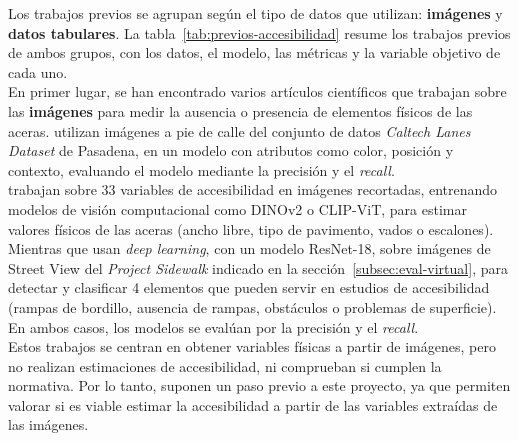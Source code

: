 Los trabajos previos se agrupan según el tipo de datos que utilizan: \textbf{imágenes} y \textbf{datos tabulares}. La tabla~\ref{tab:previos-accesibilidad} resume los trabajos previos de ambos grupos, con los datos, el modelo, las métricas y la variable objetivo de cada uno.
\\

En primer lugar, se han encontrado varios artículos científicos que trabajan sobre las \textbf{imágenes} para medir la ausencia o presencia de elementos físicos de las aceras. \textcite{smith2013} utilizan imágenes a pie de calle del conjunto de datos \textit{Caltech Lanes Dataset} de Pasadena, en un modelo  con atributos como color, posición y contexto, evaluando el modelo mediante la precisión y el \textit{recall}.
\\

\textcite{liu2024acc} trabajan sobre 33 variables de accesibilidad en imágenes recortadas, entrenando modelos de visión computacional como DINOv2 o CLIP-ViT, para estimar valores físicos de las aceras (ancho libre, tipo de pavimento, vados o escalones).
\\

Mientras que \textcite{weld2019} usan \textit{deep learning}, con un modelo ResNet-18, sobre imágenes de Street View del \textit{Project Sidewalk} indicado en la sección~\ref{subsec:eval-virtual}, para detectar y clasificar 4 elementos que pueden servir en estudios de accesibilidad (rampas de bordillo, ausencia de rampas, obstáculos o problemas de superficie). En ambos casos, los modelos se evalúan por la precisión y el \textit{recall}.
\\

Estos trabajos se centran en obtener variables físicas a partir de imágenes, pero no realizan estimaciones de accesibilidad, ni comprueban si cumplen la normativa. Por lo tanto, suponen un paso previo a este proyecto, ya que permiten valorar si es viable estimar la accesibilidad a partir de las variables extraídas de las imágenes.
\\

